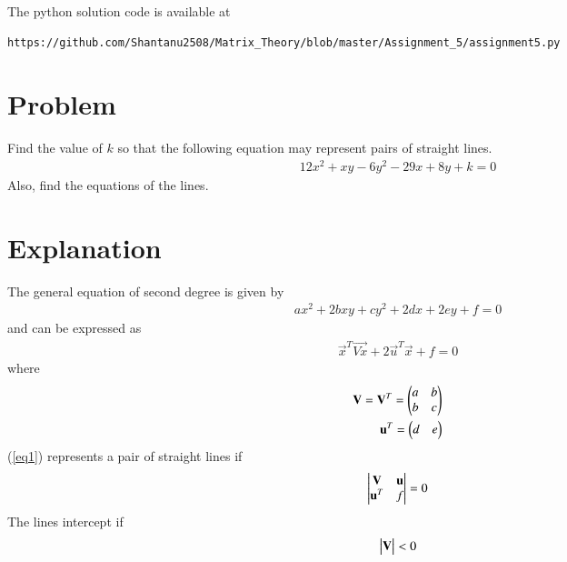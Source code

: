 \documentclass[journal,12pt,twocolumn]{IEEEtran}
\begin{document}
The python solution code is available at
\begin{lstlisting}
https://github.com/Shantanu2508/Matrix_Theory/blob/master/Assignment_5/assignment5.py
\end{lstlisting}

\section{Problem}
Find the value of $k$ so that the following equation may represent pairs of straight lines.
\begin{align*}
	12x^2 + xy -6y^2 -29x +8y +k =0 
\end{align*}
Also, find the equations of the lines.

\section{Explanation}
The general equation of second degree is given by
\begin{align}
	ax^2 + 2bxy +cy^2 +2dx +2ey +f =0            \label{eq1}
\end{align}
and can be expressed as
\begin{align}
	\vec{x}^{T}\vec{Vx} + 2\vec{u}^{T}\vec{x} + f=0   \label{eq2}
\end{align}
where
\begin{align}
	\vec{V}=\vec{V}^T=\myvec{a & b \\ b & c}   \label{eq3}  \\
	\vec{u}^T=\myvec{d &  e}            \label{eq4}
\end{align}
(\ref{eq1}) represents a pair of straight lines if
\begin{align}
	\mydet{\vec{V} & \vec{u} \\ \vec{u}^T & f} = 0     \label{eq5} 
\end{align}
The lines intercept if
\begin{align}
	\begin{vmatrix}\mathbf{V}\end{vmatrix} < 0
\end{align}
\end{document}
